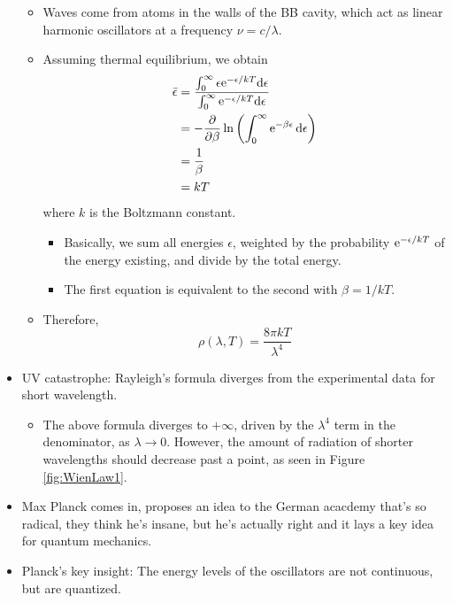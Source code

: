 \documentclass[../notes.tex]{subfiles}
\begin{document}
\begin{itemize}
\begin{itemize}
\begin{equation*}
        \end{equation*}
        \item Waves come from atoms in the walls of the BB cavity, which act as linear harmonic oscillators at a frequency $\nu=c/\lambda$.
        \item Assuming thermal equilibrium, we obtain
        \begin{align*}
            \bar{\epsilon} &= \frac{\int_0^\infty\epsilon\e[-\epsilon/kT]\dd\epsilon}{\int_0^\infty\e[-\epsilon/kT]\dd\epsilon}\\
            &= -\pdv{\beta}\ln\left( \int_0^\infty\e[-\beta\epsilon]\dd{\epsilon} \right)\\
            &= \frac{1}{\beta}\\
            &= kT
        \end{align*}
        where $k$ is the Boltzmann constant.
        \begin{itemize}
            \item Basically, we sum all energies $\epsilon$, weighted by the probability $\e[-\epsilon/kT]$ of the energy existing, and divide by the total energy.
            \item The first equation is equivalent to the second with $\beta=1/kT$.
        \end{itemize}
        \item Therefore,
        \begin{equation*}
            \rho(\lambda,T) = \frac{8\pi kT}{\lambda^4}
        \end{equation*}
    \end{itemize}
    \item UV catastrophe: Rayleigh's formula diverges from the experimental data for short wavelength.
    \begin{itemize}
        \item The above formula diverges to $+\infty$, driven by the $\lambda^4$ term in the denominator, as $\lambda\to 0$. However, the amount of radiation of shorter wavelengths should decrease past a point, as seen in Figure \ref{fig:WienLaw1}.
    \end{itemize}
    \item Max Planck comes in, proposes an idea to the German acacdemy that's so radical, they think he's insane, but he's actually right and it lays a key idea for quantum mechanics.
    \item Planck's key insight: The energy levels of the oscillators are not continuous, but are quantized.
    \begin{itemize}

\end{itemize}
\end{itemize}
\end{document}
